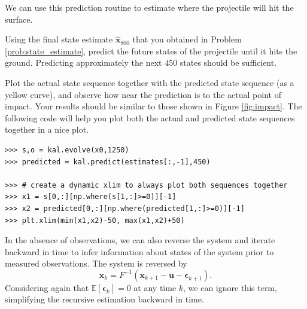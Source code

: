 We can use this prediction routine to estimate where the projectile will hit the surface.
\begin{problem}
Using the final state estimate $\widehat{\mathbf{x}}_{800}$ that you obtained in Problem \ref{prob:state_estimate}, predict the future states of the projectile until it hits the ground.
Predicting approximately the next $450$ states should be sufficient.

Plot the actual state sequence together with the predicted state sequence (as a yellow curve), and observe how near the prediction is to the actual point of impact.
Your results should be similar to those shown in Figure \ref{fig:impact}.
The following code will help you plot both the actual and predicted state sequences together in a nice plot.
\begin{lstlisting}
>>> s,o = kal.evolve(x0,1250)
>>> predicted = kal.predict(estimates[:,-1],450)

>>> # create a dynamic xlim to always plot both sequences together
>>> x1 = s[0,:][np.where(s[1,:]>=0)][-1]
>>> x2 = predicted[0,:][np.where(predicted[1,:]>=0)][-1]
>>> plt.xlim(min(x1,x2)-50, max(x1,x2)+50)
\end{lstlisting}

\end{problem}

In the absence of observations, we can also reverse the system and iterate backward in time to infer information about states of the system prior to measured observations.
The system is reversed by
\begin{equation*}
\mathbf{x}_{k} = F^{-1}(\mathbf{x}_{k+1} - \mathbf{u} - \boldsymbol{\epsilon}_{k+1}).
\end{equation*}
Considering again that $\mathbb{E}\left[\boldsymbol{\epsilon}_{k}\right] = 0$ at any time $k$, we can ignore this term, simplifying the recursive estimation backward in time.




